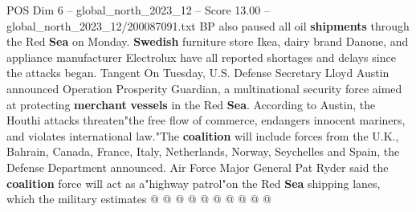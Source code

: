 \begin{textsample}{POS Dim 6 – global\_north\_2023\_12 – Score 13.00 – global\_north\_2023\_12/200087091.txt}
BP also paused all oil \textbf{shipments} through the Red \textbf{Sea} on Monday. \textbf{Swedish} furniture store Ikea, dairy brand Danone, and appliance manufacturer Electrolux have all reported shortages and delays since the attacks began.
Tangent On Tuesday, U.S.
Defense Secretary Lloyd Austin announced Operation Prosperity Guardian, a multinational security force aimed at protecting \textbf{merchant} \textbf{vessels} in the Red \textbf{Sea}.
According to Austin, the Houthi attacks threaten"the free flow of commerce, endangers innocent mariners, and violates international law."The \textbf{coalition} will include forces from the U.K., Bahrain, Canada, France, Italy, Netherlands, Norway, Seychelles and Spain, the Defense Department announced.
Air Force Major General Pat Ryder said the \textbf{coalition} force will act as a"highway patrol"on the Red \textbf{Sea} shipping lanes, which the military estimates @ @ @ @ @ @ @ @ @ @

\end{textsample}
